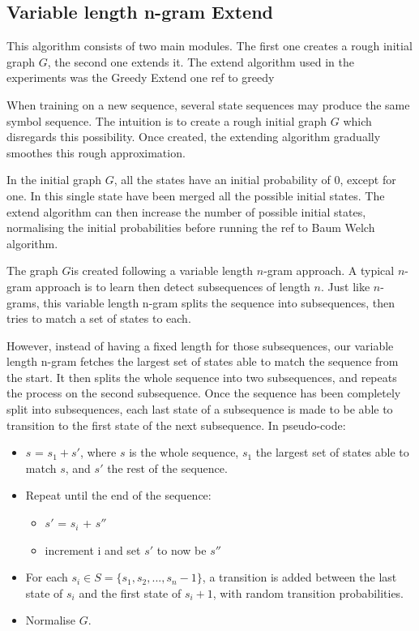\subsection{Variable length n-gram Extend}
This algorithm consists of two main modules. The first one creates a rough initial graph $G$, the second one extends it. The extend algorithm used in the experiments was the Greedy Extend one {ref to greedy}%

When training on a new sequence, several state sequences may produce the same symbol sequence. The intuition is to create a rough initial graph $G$ which disregards this possibility. Once created, the extending algorithm gradually smoothes this rough approximation.

In the initial graph $G$, all the states have an initial probability of 0, except for one. In this single state have been merged all the possible initial states. The extend algorithm can then increase the number of possible initial states, normalising the initial probabilities before running the {ref to Baum Welch} algorithm.

The graph $G$is created following a variable length $n$-gram approach. A typical $n$-gram approach is to learn then detect subsequences of length $n$. Just like $n$-grams, this variable length n-gram splits the sequence into subsequences, then tries to match a set of states to each.

However, instead of having a fixed length for those subsequences, our variable length n-gram fetches the largest set of states able to match the sequence from the start. It then splits the whole sequence into two subsequences, and repeats the process on the second subsequence. Once the sequence has been completely split into subsequences, each last state of a subsequence is made to be able to transition to the first state of the next subsequence. In pseudo-code:

\begin{itemize}
	\item $s$ = $s_1 + s'$, where $s$ is the whole sequence, $s_1$ the largest set of states able to match $s$, and $s'$ the rest of the sequence.
	\item Repeat until the end of the sequence:
	\begin{itemize}
		\item $s'$ = $s_i$ + $s''$
		\item increment i and set $s'$ to now be $s''$
	\end{itemize}
	\item For each $s_i \in S = \{s_1, s_2, ... , s_n-1\}$, a transition is added between the last state of $s_i$ and the first state of $s_i+1$, with random transition probabilities.
	\item Normalise $G$.
\end{itemize}

